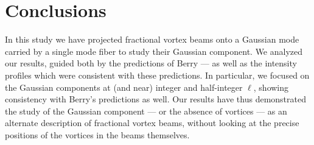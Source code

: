 \documentclass[10pt,a4paper,twoside]{article}
\renewcommand{\l}{\ell}
\begin{document}








\section{Conclusions}

In this study we have projected fractional vortex beams onto a Gaussian mode carried by a single mode fiber to study their Gaussian component. We analyzed our results, guided both by the predictions of Berry --- as well as the intensity profiles which were consistent with these predictions. In particular, we focused on the Gaussian components at (and near) integer and half-integer $\l$, showing consistency with Berry's predictions as well. Our results have thus demonstrated the study of the Gaussian component --- or the absence of vortices --- as an alternate description of fractional vortex beams, without looking at the precise positions of the vortices in the beams themselves.
\end{document}
